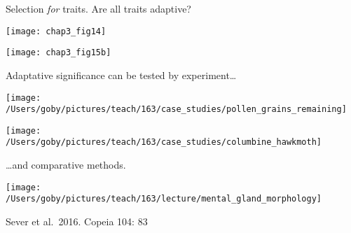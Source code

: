 \documentclass[t]{beamer}
\begin{document}
\begin{frame}[t]{Selection \emph{for} traits. \hfill Are all traits adaptive?}

\vspace{-\baselineskip}

\begin{multicols}{2}
\texttt{[image: chap3\_fig14]}

\columnbreak

\texttt{[image: chap3\_fig15b]}
\end{multicols}


\end{frame}

\begin{frame}[t]{Adaptative significance can be tested by experiment\dots}

\vspace{-\baselineskip}

\begin{multicols}{2}
\texttt{[image: /Users/goby/pictures/teach/163/case\_studies/pollen\_grains\_remaining]}

\columnbreak

\texttt{[image: /Users/goby/pictures/teach/163/case\_studies/columbine\_hawkmoth]}


\end{multicols}

\end{frame}


\begin{frame}[t]{\dots and comparative methods.}
	
	\centering

\texttt{[image: /Users/goby/pictures/teach/163/lecture/mental\_gland\_morphology]}	
	
\tinyfill Sever et al.~2016. Copeia 104: 83


\end{frame}
\end{document}
